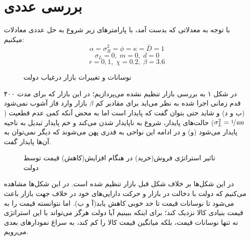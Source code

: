 \documentclass[13pt,onecolumn,a4paper]{article}
\begin{document}
\section{بررسی عددی}
با توجه به معدلاتی که بدست آمد، با پارامترهای زیر شروع به حل عددی معادلات میکنیم:
$$\alpha=\sigma_R^2=\phi=\kappa=\bar{D}=1$$
$$\sigma_L=0,\;m=0,\;d=0$$
$$r=0,1,\; \chi=0.2,\;\beta=3.6$$

	
	
	\begin{figure}[H]
		\centering
		\hfil
		
		\medskip
		\hfil
		
		\medskip
		\hfil
		\caption{نوسانات و تغییرات بازار درغیاب دولت }
		\label{fig:myfigure}
	\end{figure}
در شکل ۱ به بررسی بازار تنظیم نشده می‌پردازیم؛ در این بازار که برای مدت ۴۰۰ قدم زمانی اجرا شده به نظر می‌اید برای مقادیر کم $\beta$ بازار وارد فاز آشوب نمی‌شود (ب و د) و شاید حتی بتوان گفت که پایدار است اما به محض آنکه کمی عدم قطعیت ($\sigma_L^2=\nicefrac{1}{400}$) حالت‌های پایدار، شروع به ناپایدار شدن می‌کند و خم پایدار تبدیل به ناحیه پایدار می‌شود (و) و در ادامه این نواحی به قدری پهن می‌شوند که دیگر نمی‌توان به آن‌ها پایدار گفت.




		\begin{figure}[H]
		\centering
		\hfil
		
		\medskip
		\hfil
		
		\caption{تاثیر استراتژی فروش(خرید) در هنگام افزایش(کاهش) قیمت توسط دولت }
		\label{fig:myfigure}
	\end{figure}
در این شکل‌ها بر خلاف شکل قبل بازار تنظیم شده است. در این شکل‌ها مشاهده می‌کنیم که دولت با دخالت در بازار و حرکت دارایی‌های خود در خلاف جهت بازار باعث می‌شود تا نوسانات قیمت تا حد خوبی کاهش یابد(آ و ب). اما نتوانسته قیمت را به قیمت بنیادی کالا نزدیک کند؛ برای اینکه ببینیم آیا دولت هرگز می‌تواند با این استراتژی نه تنها نوسانات قیمت، بلکه میانگین قیمت کالا را کم کند، به سراغ نمودارهای بعدی می‌رویم.
\end{document}
